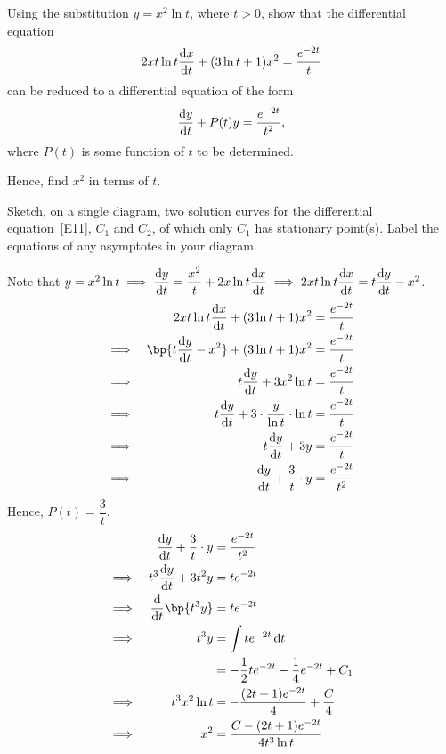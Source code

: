 \documentclass{echw}
\begin{document}
    \problem{}
        Using the substitution $y = x^2 \ln t$, where $t > 0$, show that the differential equation
        \begin{equation}\label{E11}
            2xt \ln t \dfrac{\mathrm{d} x}{\mathrm{d} t} + (3\ln t + 1)x^2 = \dfrac{e^{-2t}}{t}
        \end{equation}
        can be reduced to a differential equation of the form \[\dfrac{\mathrm{d} y}{\mathrm{d} t} + P(t) y = \dfrac{e^{-2t}}{t^2},\] where $P(t)$ is some function of $t$ to be determined.

        Hence, find $x^2$ in terms of $t$.

        Sketch, on a single diagram, two solution curves for the differential equation~\ref{E11}, $C_1$ and $C_2$, of which only $C_1$ has stationary point(s). Label the equations of any asymptotes in your diagram.

    \solution
        Note that $y = x^2 \ln t \implies \dfrac{\mathrm{d} y}{\mathrm{d} t} = \dfrac{x^2}{t} + 2x\ln t \dfrac{\mathrm{d} x}{\mathrm{d} t} \implies 2xt \ln t \dfrac{\mathrm{d} x}{\mathrm{d} t} = t\dfrac{\mathrm{d} y}{\mathrm{d} t} - x^2$.
        \begin{alignat*}{2}
            && 2xt \ln t \der{x}{t} + (3\ln t + 1)x^2 &= \dfrac{e^{-2t}}{t}\\
            \implies&& \bp{t\der{y}{t} - x^2} + (3\ln t + 1)x^2 &= \dfrac{e^{-2t}}{t}\\
            \implies&& t\der{y}{t} + 3x^2\ln t &= \dfrac{e^{-2t}}{t}\\
            \implies&& t\der{y}{t} + 3 \cdot \dfrac{y}{\ln t} \cdot \ln t &= \dfrac{e^{-2t}}{t}\\
            \implies&& t\der{y}{t} + 3y &= \dfrac{e^{-2t}}{t}\\
            \implies&& \der{y}{t} + \dfrac{3}{t} \cdot y &= \dfrac{e^{-2t}}{t^2}
        \end{alignat*}
        Hence, $P(t) = \dfrac3t$.
        \begin{alignat*}{2}
            && \der{y}{t} + \dfrac{3}{t} \cdot y &= \dfrac{e^{-2t}}{t^2}\\
            \implies&& t^3 \der{y}{t} + 3t^2y &= te^{-2t}\\
            \implies&& \der{}{t} \bp{t^3 y} &= te^{-2t}\\
            \implies&& t^3 y &= \int te^{-2t} \d t\\
            && &= -\dfrac{1}{2} te^{-2t} - \dfrac14 e^{-2t} + C_1\\
            \implies&& t^3 x^2 \ln t &= -\dfrac{(2t+1)e^{-2t}}4 + \dfrac{C}{4}\\
            \implies&& x^2 &= \dfrac{C-(2t+1)e^{-2t}}{4t^3 \ln t}
        \end{alignat*}
\end{document}
